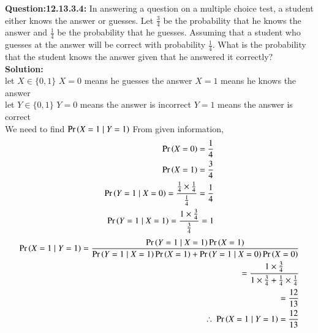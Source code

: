 \documentclass[12pt, journal]{IEEEtran}
\begin{document}
		\maketitle
	\textbf{Question:12.13.3.4:}
	In answering a question on a multiple choice test, a student either knows the answer or guesses. 
	Let $\frac{3}{4}$ be the probability that he knows the answer and $\frac{1}{4}$ be the probability that he guesses.
	Assuming that a student who guesses at the answer will be correct with probability $\frac{1}{4}$.
	What is the probability that the student knows the answer given that he answered it correctly?\\
	\textbf{Solution: }\\
	let $X \in \{0, 1 \}$
	$X=0$ means he guesses the answer
	$X=1$ means he knows the answer\\
	let $Y \in \{0, 1\}$
	$Y=0$ means the answer is incorrect
	$Y=1$ means the answer is correct\\
	We need to find $\Pr\left(X=1 \mid Y=1\right)$
	From given information,
	\begin{align}	
		\Pr\left(X=0\right)=\frac{1}{4}\\
		\Pr\left(X=1\right)=\frac{3}{4}\\
		\Pr\left(Y=1\mid X=0\right)=\frac{\frac{1}{4}\times\frac{1}{4}}{\frac{1}{4}}=\frac{1}{4}\\
		\Pr\left(Y=1\mid X=1\right)=\frac{1\times\frac{3}{4}}{\frac{3}{4}}=1
	\end{align}
	\begin{align}
		\Pr\left(X=1\mid Y=1\right)=\frac{\Pr\left(Y=1\mid X=1\right)\Pr\left(X=1\right)}{\Pr\left(Y=1\mid X=1\right)\Pr\left(X=1\right)+\Pr\left(Y=1\mid X=0\right)\Pr\left(X=0\right)}\\
=\frac{1\times\frac{3}{4}}{1\times\frac{3}{4}+\frac{1}{4}\times\frac{1}{4}}\\
		=\frac{12}{13}\\
		\therefore~\Pr\left(X=1\mid Y=1\right)=\frac{12}{13}
	\end{align}
\end{document}
